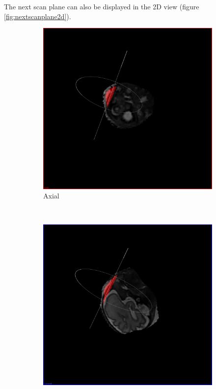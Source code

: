 The next scan plane can also be displayed in the 2D view (figure \ref{fig:nextscanplane2d}).

\begin{figure}[H]
  \centering
  \begin{subfigure}[b]{0.3\textwidth}
    \includegraphics[width=\textwidth]{images/next_scan_plane/axial.png}
    \caption*{Axial}
    \label{fig:nextscanplaneaxial}
  \end{subfigure}%
  ~ %
  \begin{subfigure}[b]{0.3\textwidth}
    \includegraphics[width=\textwidth]{images/next_scan_plane/coronal.png}

\end{subfigure}
\end{figure}
